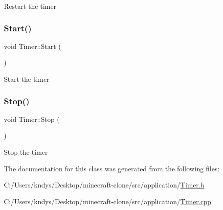 Restart the timer 

\mbox{\label{class_timer_a4e607b129b392c11adddd9641a320436}} 
\subsubsection{\texorpdfstring{Start()}{Start()}}
{\footnotesize\ttfamily void Timer\+::\+Start (\begin{DoxyParamCaption}{ }\end{DoxyParamCaption})}



Start the timer 

\mbox{\label{class_timer_a6379e797f968aaee6ac3bb12dc6b81c5}} 
\subsubsection{\texorpdfstring{Stop()}{Stop()}}
{\footnotesize\ttfamily void Timer\+::\+Stop (\begin{DoxyParamCaption}{ }\end{DoxyParamCaption})}



Stop the timer 



The documentation for this class was generated from the following files\+:\begin{DoxyCompactItemize}
\item 
C\+:/\+Users/kndys/\+Desktop/minecraft-\/clone/src/application/\mbox{\hyperlink{_timer_8h}{Timer.\+h}}\item 
C\+:/\+Users/kndys/\+Desktop/minecraft-\/clone/src/application/\mbox{\hyperlink{_timer_8cpp}{Timer.\+cpp}}\end{DoxyCompactItemize}
